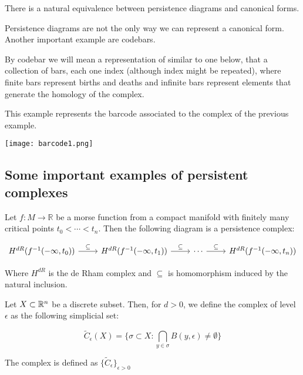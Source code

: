 \begin{proposition}[Canonical form = Persistence diagrams]

There is a natural equivalence between persistence diagrams and canonical forms.

\end{proposition}


Persistence diagrams are not the only way we can represent a canonical form. 
Another important example are codebars.

\begin{definition}
[Codebars]

By codebar we will mean a representation of similar to one below,
that a collection of bars, each one index (although index might be repeated),
where finite bars represent births and deaths and infinite bars represent elements that generate the homology of the complex.
\end{definition}

\begin{example}
This example represents the barcode
associated to the complex of the previous example.
\end{example}

\begin{center}
\texttt{[image: barcode1.png]}
\end{center}


\subsection{Some important examples of persistent complexes}
\label{examplespersistence}

\begin{definition}
Let $f:M\to\mathbb{R}$ be a morse function from a compact manifold 
with finitely many critical points $t_0<\cdots<t_n$. Then the following diagram
is a persistence complex:

$$
\begin{tikzcd}
H^{dR}(f^{-1}(-\infty,t_0)) \arrow[r,"\subseteq"]
& H^{dR}(f^{-1}(-\infty,t_1)) \arrow[r,"\subseteq"]
& \cdots\arrow[r,"\subseteq"]
& H^{dR}(f^{-1}(-\infty,t_n))
\end{tikzcd}
$$

Where $H^{dR}$ is the de Rham complex and $\subseteq$
is homomorphism induced by the natural inclusion.

\end{definition}

\begin{definition}

Let $X\subset \mathbb{R}^n$ be a discrete subset. Then, for $d>0$, we define the {\Cech}
complex of level $\epsilon$ as the following simplicial set:


$$
\tilde{C}_\epsilon(X)
=
\{
\sigma \subset X :
\bigcap_{y\in\sigma} B(y,\epsilon)\neq \emptyset
\}
$$

The {\Cech} complex is defined as $\{\tilde{C}_\epsilon\}_{\epsilon>0}$

\end{definition}

